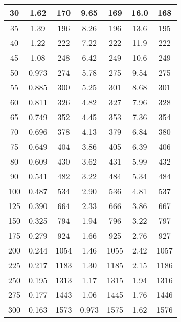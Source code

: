 \begin{table}[htbp]
\begin{tabular}{|c|c|c|c|c|c|c|}
30 & 1.62 & 170 & 9.65 & 169 & 16.0 & 168 \\ \hline
35 & 1.39 & 196 & 8.26 & 196 & 13.6 & 195 \\ \hline
40 & 1.22 & 222 & 7.22 & 222 & 11.9 & 222 \\ \hline
45 & 1.08 & 248 & 6.42 & 249 & 10.6 & 249 \\ \hline
50 & 0.973 & 274 & 5.78 & 275 & 9.54 & 275 \\ \hline
55 & 0.885 & 300 & 5.25 & 301 & 8.68 & 301 \\ \hline
60 & 0.811 & 326 & 4.82 & 327 & 7.96 & 328 \\ \hline
65 & 0.749 & 352 & 4.45 & 353 & 7.36 & 354 \\ \hline
70 & 0.696 & 378 & 4.13 & 379 & 6.84 & 380 \\ \hline
75 & 0.649 & 404 & 3.86 & 405 & 6.39 & 406 \\ \hline
80 & 0.609 & 430 & 3.62 & 431 & 5.99 & 432 \\ \hline
90 & 0.541 & 482 & 3.22 & 484 & 5.34 & 484 \\ \hline
100 & 0.487 & 534 & 2.90 & 536 & 4.81 & 537 \\ \hline
125 & 0.390 & 664 & 2.33 & 666 & 3.86 & 667 \\ \hline
150 & 0.325 & 794 & 1.94 & 796 & 3.22 & 797 \\ \hline
175 & 0.279 & 924 & 1.66 & 925 & 2.76 & 927 \\ \hline
200 & 0.244 & 1054 & 1.46 & 1055 & 2.42 & 1057 \\ \hline
225 & 0.217 & 1183 & 1.30 & 1185 & 2.15 & 1186 \\ \hline
250 & 0.195 & 1313 & 1.17 & 1315 & 1.94 & 1316 \\ \hline
275 & 0.177 & 1443 & 1.06 & 1445 & 1.76 & 1446 \\ \hline
300 & 0.163 & 1573 & 0.973 & 1575 & 1.62 & 1576 \\ \hline
\end{tabular}
\end{table}




